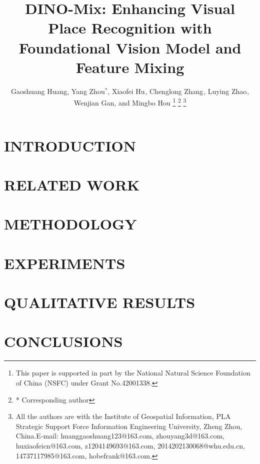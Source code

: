 \documentclass[letterpaper, 10 pt, conference]{ieeeconf}  %
\title{\LARGE \bf DINO-Mix: Enhancing Visual Place Recognition with Foundational Vision Model and Feature Mixing}
\author{Gaoshuang Huang, Yang Zhou$^{*}$, Xiaofei Hu$^{}$, Chenglong Zhang$^{}$, Luying Zhao$^{}$, Wenjian Gan, and Mingbo Hou  %
\thanks{This paper is supported in part by the National Natural Science Foundation of China (NSFC) under Grant No.42001338.}
\thanks{* Corresponding author}%
\thanks{All the authors are with the Institute of Geospatial Information, PLA Strategic Support Force Information Engineering University, Zheng Zhou, China.E-mail: huanggaoshuang123@163.com, zhouyang3d@163.com, huxiaofeicn@163.com, 
z1204149693@163.com, 2014202130068@whu.edu.cn, 14737117985@163.com, hobefrank@163.com.}}
\begin{document}
\maketitle
\thispagestyle{plain} %

\begin{abstract}

\end{abstract}


\section{INTRODUCTION}
\label{sec:introduction}


\section{RELATED WORK}
\label{sec:related work}


\section{METHODOLOGY}
\label{sec:methodology}


\section{EXPERIMENTS}
\label{sec:experiments}


\section{QUALITATIVE RESULTS}
\label{sec:Qualitative results}


\section{CONCLUSIONS}
\label{sec:conclusions}




\end{document}
